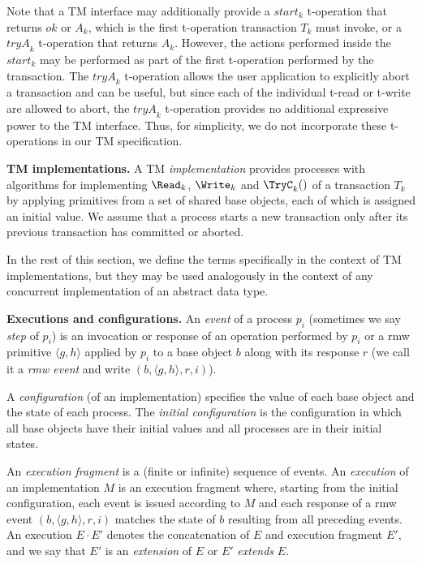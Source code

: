 Note that a TM interface may additionally provide a $\textit{start}_k$ t-operation that returns $ok$ or $A_k$, 
which is the first t-operation
transaction $T_k$ must invoke, or a $\textit{tryA}_k$ t-operation that returns $A_k$.
However, the actions performed inside the $\textit{start}_k$ may be performed as part of the first t-operation performed
by the transaction. The $\textit{tryA}_k$ t-operation allows the user application
to explicitly abort a transaction and can be useful, but since each of the individual t-read or t-write are allowed to abort,
the $\textit{tryA}_k$ t-operation provides no additional expressive power to the TM interface.
Thus, for simplicity, we do not incorporate these t-operations in our TM specification.

\vspace{1mm}\noindent\textbf{TM implementations.}
A TM \emph{implementation} provides processes with algorithms
for implementing $\Read_k$, $\Write_k$ and $\TryC_k()$
of a transaction $T_k$ by applying primitives from a set of shared base objects, each of which is 
assigned an initial value.
We assume that a process starts a new transaction
only after its previous transaction has committed or aborted.

In the rest of this section, we define the terms specifically in the context of TM implementations, but
they may be used analogously in the context of any concurrent implementation of an abstract data type.

\vspace{1mm}\noindent\textbf{Executions and configurations.}
An \emph{event} of a process $p_i$ (sometimes we say \emph{step} of $p_i$)
is an invocation or response of an operation performed by $p_i$ or a 
rmw primitive $\langle g,h \rangle$ applied by $p_i$ to a base object $b$
along with its response $r$ (we call it a \emph{rmw event} and write $(b, \langle g,h\rangle, r,i)$).


A \emph{configuration} (of an implementation) specifies the value of each base object and 
the state of each process.
The \emph{initial configuration} is the configuration in which all 
base objects have their initial values and all processes are in their initial states.

An \emph{execution fragment} is a (finite or infinite) sequence of events.
An \emph{execution} of an implementation $M$ is an execution
fragment where, starting from the initial configuration, each event is
issued according to $M$ and each response of a rmw event $(b, \langle
g,h\rangle, r,i)$ matches the state of $b$ resulting from all
preceding events.
An execution $E\cdot E'$ denotes the concatenation of $E$ and execution fragment $E'$,
and we say that $E'$ is an \emph{extension} of $E$ or $E'$ \emph{extends} $E$.

